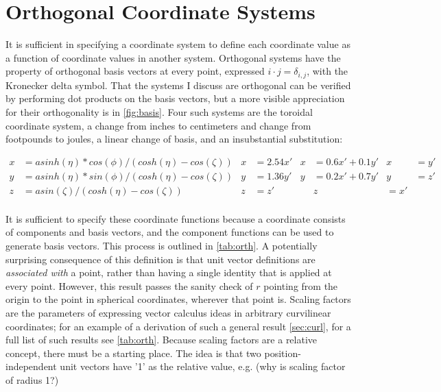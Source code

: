 \documentclass{article}
\begin{document}
\section*{Orthogonal Coordinate Systems}

It is sufficient in specifying a coordinate system to define each coordinate value as a function of coordinate values in another system. Orthogonal systems have the property of orthogonal basis vectors at every point, expressed $\unit{i} \cdot \unit{j} = \delta_{i,j}$, with the Kronecker delta symbol. That the systems I discuss are orthogonal can be verified by performing dot products on the basis vectors, but a more visible appreciation for their orthogonality is in \cref{fig:basis}. Four such systems are the toroidal coordinate system, a change from inches to centimeters and change from footpounds to joules, a linear change of basis, and an insubstantial substitution:

\begin{align*}
x &= a sinh(\eta) * cos(\phi) / (cosh(\eta) - cos(\zeta)) & x &= 2.54 x'  & x &= 0.6 x' + 0.1 y' & x &= y'\\
y &= a sinh(\eta) * sin(\phi) / (cosh(\eta) - cos(\zeta)) & y &= 1.36 y'  & y &= 0.2 x' + 0.7 y' & y &= z' \\
z &= a sin(\zeta) / (cosh(\eta) - cos(\zeta))             & z &= z'       &                      & z &= x' \\
\end{align*}

It is sufficient to specify these coordinate functions because a coordinate consists of components and basis vectors, and the component functions can be used to generate basis vectors. This process is outlined in \cref{tab:orth}. A potentially surprising consequence of this definition is that unit vector definitions are \textit{associated with} a point, rather than having a single identity that is applied at every point. However, this result passes the sanity check of $\unit{r}$ pointing from the origin to the point in spherical coordinates, wherever that point is. Scaling factors are the parameters of expressing vector calculus ideas in arbitrary curvilinear coordinates; for an example of a derivation of such a general result \cref{sec:curl}, for a full list of such results see \cref{tab:orth}. Because scaling factors are a relative concept, there must be a starting place. The idea is that two position-independent unit vectors have '1' as the relative value, e.g. (why is scaling factor of radius 1?)
\end{document}
